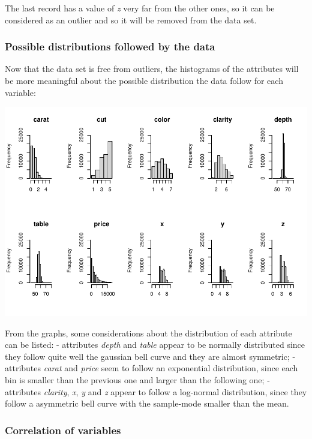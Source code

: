 \documentclass[
]{article}
\begin{document}
The last record has a value of \emph{z} very far from the other ones, so
it can be considered as an outlier and so it will be removed from the
data set.

\subsubsection{Possible distributions followed by the
data}\label{possible-distributions-followed-by-the-data}

Now that the data set is free from outliers, the histograms of the
attributes will be more meaningful about the possible distribution the
data follow for each variable:

\includegraphics{Report_files/figure-latex/unnamed-chunk-8-1.pdf}

From the graphs, some considerations about the distribution of each
attribute can be listed: - attributes \emph{depth} and \emph{table}
appear to be normally distributed since they follow quite well the
gaussian bell curve and they are almost symmetric; - attributes
\emph{carat} and \emph{price} seem to follow an exponential
distribution, since each bin is smaller than the previous one and larger
than the following one; - attributes \emph{clarity}, \emph{x}, \emph{y}
and \emph{z} appear to follow a log-normal distribution, since they
follow a asymmetric bell curve with the sample-mode smaller than the
mean.

\subsubsection{Correlation of variables}\label{correlation-of-variables}
\end{document}
